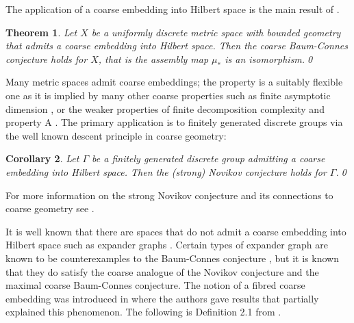 \documentclass[11pt]{amsart}
\theoremstyle{plain}
\newtheorem{theorem}{Theorem}%
\newtheorem{corollary}[theorem]{Corollary}%
\theoremstyle{definition}%
\theoremstyle{remark}%
\begin{document}
The application of a coarse embedding into Hilbert space is the main result of \cite{MR1728880, MR1905840}.

\begin{theorem}
Let $X$ be a uniformly discrete metric space with bounded geometry that admits a coarse embedding into Hilbert space. Then the coarse Baum-Connes conjecture holds for $X$, that is the assembly map $\mu_{*}$ is an isomorphism.\qed
\end{theorem}

Many metric spaces admit coarse embeddings; the property is a suitably flexible one as it is implied by many other coarse properties such as finite asymptotic dimension \cite{MR1739727}, or the weaker properties of finite decomposition complexity \cite{MR2947546} and property A \cite{MR1728880}. The primary application is to finitely generated discrete groups via the well known descent principle in coarse geometry:

\begin{corollary}
Let $\Gamma$ be a finitely generated discrete group admitting a coarse embedding into Hilbert space. Then the (strong) Novikov conjecture holds for $\Gamma$.\qed
\end{corollary}

For more information on the strong Novikov conjecture and its connections to coarse geometry see \cite{MR1388300, MR1905840}.

It is well known that there are spaces that do not admit a coarse embedding into Hilbert space such as expander graphs \cite{MR2569682}. Certain types of expander graph are known to be counterexamples to the Baum-Connes conjecture \cite{higsonpreprint,MR1911663,explg1,explg2,MR2568691}, but it is known that they do satisfy the coarse analogue of the Novikov conjecture and the maximal coarse Baum-Connes conjecture. The notion of a fibred coarse embedding was introduced in \cite{FCEpaper} where the authors gave results that partially explained this phenomenon. The following is Definition 2.1 from \cite{FCEpaper}.
\end{document}
